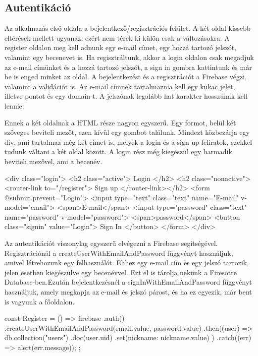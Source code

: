 \subsection{Autentikáció}
Az alkalmazás első oldala a bejelentkező/regisztrációs felület. A két oldal kissebb eltérések mellett ugyanaz, ezért nem térek ki külön csak a változásokra. A register oldalon meg kell adnunk egy e-mail címet, egy hozzá tartozó jelszót, valamint egy becenevet is. Ha regisztráltunk, akkor a login oldalon csak megadjuk az e-mail címünket és a hozzá tartozó jelszót, a sign in gombra kattintunk és már be is enged minket az oldal. A bejelentkezést és a regisztrációt a Firebase végzi, valamint a validációt is. Az e-mail címnek tartalmaznia kell egy kukac jelet, illetve pontot és egy domain-t. A jelszónak legalább hat karakter hosszúnak kell lennie.

Ennek a két oldalnak a HTML része nagyon egyszerű. Egy formot, belül két szöveges beviteli mezőt, ezen kívül egy gombot találunk. Mindezt közbezárja egy div, ami tartalmaz még két címet is, melyek a login és a sign up feliratok, ezekkel tudunk váltani a két oldal között. A login rész még kiegészül egy harmadik beviteli mezővel, ami a becenév.

\begin{python}
<div class="login">
  <h2 class="active"> Login </h2>
  <h2 class="nonactive"><router-link to="/register"> Sign up </router-link></h2> 
  <form @submit.prevent="Login">
    <input type="text" class="text" name="E-mail" v-model="email">
    <span>E-mail</span>
    <input type="password" class="text" name="password" v-model="password">
    <span>password</span>
    <button class="signin" value="Login">
      Sign In
    </button>
  </form>
</div>
\end{python}

Az autentikációt viszonylag egyszerű elvégezni a Firebase segítségével. Regisztrációnál a createUserWithEmailAndPassword függvényt használjuk, amivel létrehozunk egy felhasználót. Ehhez egy e-mail cím és egy jelszó tartozik, jelen esetben kiegészülve egy becenévvel. Ezt el is tárolja nekünk a Firesotre Database-ben.Ezután bejelentkezésnél a signInWithEmailAndPassword függvényt használjuk, amely megkapja az e-mail és jelszó párost, és ha ez egyezik, már bent is vagyunk a főoldalon.

\begin{python}
const Register = () => {
      firebase
        .auth()
        .createUserWithEmailAndPassword(email.value, password.value)
        .then((user) => {
          db.collection("users")
            .doc(user.uid)
            .set({nickname: nickname.value})
        })
        .catch((err) => alert(err.message));
    };
\end{python}

